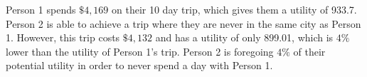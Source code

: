 \documentclass[12pt]{article}
\begin{document}
Person 1 spends $\$4,169$ on their 10 day trip, which gives them a utility of 933.7. Person 2 is able to achieve a trip where they are never in the same city as Person 1. However, this trip costs $\$4,132$ and has a utility of only 899.01, which is $4\%$ lower than the utility of Person 1's trip. Person 2 is foregoing $4\%$ of their potential utility in order to never spend a day with Person 1.
\end{document}
